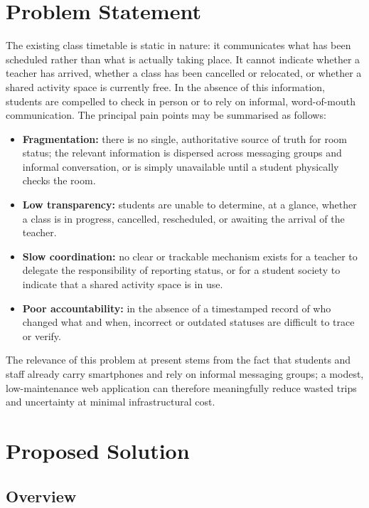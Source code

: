 \documentclass[11pt]{article}
\begin{document}
\section{Problem Statement}

The existing class timetable is static in nature: it communicates what has been scheduled rather than what is actually taking place. It cannot indicate whether a teacher has arrived, whether a class has been cancelled or relocated, or whether a shared activity space is currently free. In the absence of this information, students are compelled to check in person or to rely on informal, word-of-mouth communication. The principal pain points may be summarised as follows:

\begin{itemize}
    \item \textbf{Fragmentation:} there is no single, authoritative source of truth for room status; the relevant information is dispersed across messaging groups and informal conversation, or is simply unavailable until a student physically checks the room.
    \item \textbf{Low transparency:} students are unable to determine, at a glance, whether a class is in progress, cancelled, rescheduled, or awaiting the arrival of the teacher.
    \item \textbf{Slow coordination:} no clear or trackable mechanism exists for a teacher to delegate the responsibility of reporting status, or for a student society to indicate that a shared activity space is in use.
    \item \textbf{Poor accountability:} in the absence of a timestamped record of who changed what and when, incorrect or outdated statuses are difficult to trace or verify.
\end{itemize}

The relevance of this problem at present stems from the fact that students and staff already carry smartphones and rely on informal messaging groups; a modest, low-maintenance web application can therefore meaningfully reduce wasted trips and uncertainty at minimal infrastructural cost.

\section{Proposed Solution}

\subsection{Overview}
\end{document}
